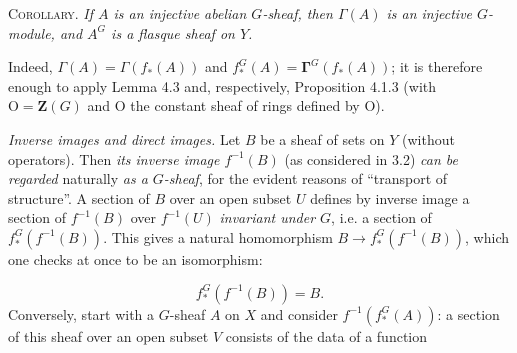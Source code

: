 \textsc{Corollary.} \textit{If $A$ is an injective abelian
$G$-sheaf, then $\Gamma(A)$ is an injective $G$-module, and $A^G$ is a flasque
sheaf on $Y$.}

Indeed, $\Gamma(A)=\Gamma(f_*(A))$ and
$f_*^G(A)=\mathbf{\Gamma}^G(f_*(A))$; it is therefore enough to apply Lemma 4.3 and,
respectively, Proposition 4.1.3 (with ${\mathrm O}=\mathbf Z(G)$ and ${\mathrm O}$ the constant
sheaf of rings defined by ${\mathrm O}$).

\textit{Inverse images and direct images.} Let $B$ be a sheaf of sets
on $Y$ (without operators). Then \textit{its inverse image $f^{-1}(B)$} (as
considered in 3.2) \textit{can be regarded} naturally \textit{as a $G$-sheaf}, for the
evident reasons of ``transport of structure''. A section of $B$ over an open
subset $U$ defines by inverse image a section of $f^{-1}(B)$ over $f^{-1}(U)$
\textit{invariant under $G$}, i.e. a section of $f_*^G(f^{-1}(B))$. This gives
a natural homomorphism $B\to f_*^G(f^{-1}(B))$, which one checks
at once to be an isomorphism:

\[
f_*^G(f^{-1}(B))=B.
\tag{5.1.1}
\]
Conversely, start with a $G$-sheaf $A$ on $X$ and consider
$f^{-1}(f_*^G(A))$: a section of this sheaf over an open subset $V$ consists
of the data of a function

